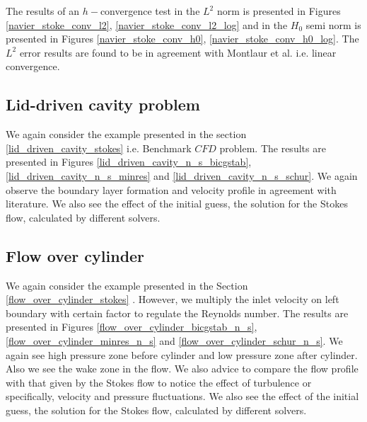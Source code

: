 \documentclass[a4paper,twoside,openright]{book}
\begin{document}
The results of an $h-$convergence test in the $L^2$ norm is presented in Figures \ref{navier_stoke_conv_l2}, \ref{navier_stoke_conv_l2_log} and in the $H_0$ semi norm is presented in Figures \ref{navier_stoke_conv_h0}, \ref{navier_stoke_conv_h0_log}. The $L^2$ error results are found to be in agreement with Montlaur et al. \cite{Montlaur} i.e. linear convergence.\\

\subsection{Lid-driven cavity problem} \label{lid_driven_cavity_navier_stokes}

We again consider the example presented in the section \ref{lid_driven_cavity_stokes} i.e. Benchmark $CFD$ problem. The results are presented in Figures \ref{lid_driven_cavity_n_s_bicgstab}, \ref{lid_driven_cavity_n_s_minres} and \ref{lid_driven_cavity_n_s_schur}. We again observe the boundary layer formation and velocity profile in agreement with literature. We also see the effect of the initial guess, the solution for the Stokes flow, calculated by different solvers. 

\subsection{Flow over cylinder} \label{flow_over_cylinder_navier_stokes}

We again consider the example presented in the Section \ref{flow_over_cylinder_stokes} . However, we multiply the inlet velocity on left boundary with certain factor to regulate the Reynolds number. The results are presented in Figures \ref{flow_over_cylinder_bicgstab_n_s}, \ref{flow_over_cylinder_minres_n_s} and \ref{flow_over_cylinder_schur_n_s}. We again see high pressure zone before cylinder and low pressure zone after cylinder. Also we see the wake zone in the flow. We also advice to compare the flow profile with that given by the Stokes flow to notice the effect of turbulence or specifically, velocity and pressure fluctuations. We also see the effect of the initial guess, the solution for the Stokes flow, calculated by different solvers. 
\end{document}
